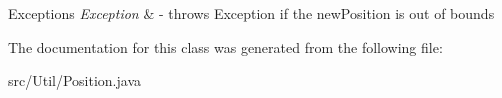 \begin{DoxyExceptions}{Exceptions}
{\em Exception} & -\/ throws Exception if the new\-Position is out of bounds \\
\hline
\end{DoxyExceptions}


The documentation for this class was generated from the following file\-:\begin{DoxyCompactItemize}
\item 
src/\-Util/Position.\-java\end{DoxyCompactItemize}
